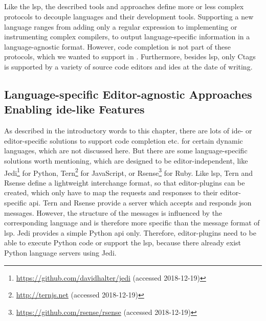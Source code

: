     \subparagraph{}
    Like the \ac{lsp}, the described tools and approaches define more or less complex protocols to decouple languages and their development tools. Supporting a new language ranges from adding only a regular expression to implementing or instrumenting complex compilers, to output language-specific information in a language-agnostic format. However, code completion is not part of these protocols, which we wanted to support in \graallsp. Furthermore, besides \ac{lsp}, only Ctags is supported by a variety of source code editors and \acp{ide} at the date of writing.


\subsection{Language-specific Editor-agnostic Approaches Enabling \ac{ide}-like Features}
    As described in the introductory words to this chapter, there are lots of \ac{ide}- or editor-specific solutions to support code completion etc. for certain dynamic languages, which are not discussed here. But there are some language-specific solutions worth mentioning, which are designed to be editor-independent, like Jedi\footnote{\url{https://github.com/davidhalter/jedi} (accessed 2018-12-19)} for Python, Tern\footnote{\url{http://ternjs.net} (accessed 2018-12-19)} for JavaScript, or Rsense\footnote{\url{https://github.com/rsense/rsense} (accessed 2018-12-19)} for Ruby. Like \ac{lsp}, Tern and Rsense define a lightweight interchange format, so that editor-plugins can be created, which only have to map the requests and responses to their editor-specific \ac{api}. Tern and Rsense provide a server which accepts and responds \ac{json} messages. However, the structure of the messages is influenced by the corresponding language and is therefore more specific than the message format of \ac{lsp}. Jedi provides a simple Python \ac{api} only. Therefore, editor-plugins need to be able to execute Python code or support the \ac{lsp}, because there already exist Python language servers using Jedi.

